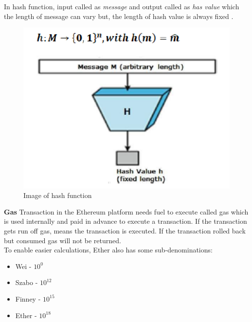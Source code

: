In hash function, input called as \textit{message} and output called as  \textit{has value} which the length of message can vary but, the length of hash value is always fixed \cite{fips}.\\
\begin{center}
	\begin{figure}[htb!]
		
		\begin{minipage}{0.35\linewidth}
			\centering
			\includegraphics[width=1.95\textwidth]{images/chap01_hash_function.png}
		\end{minipage}
		\caption[Image of hash function]{Image of hash function}
		
	\end{figure}
	
\end{center}
\textbf{Gas} Transaction in the Ethereum platform needs fuel to execute called gas which is used internally and paid in advance to execute a transaction. If the transaction gets run off gas, means the transaction is executed. If the transaction rolled back but consumed gas will not be returned.\\
To enable easier calculations, Ether also has some sub-denominations\cite{Egbertsen}:\\
\begin{itemize}
	\item Wei - $10^0$
	\item Szabo - $10^12$
	\item Finney - $10^15$
	\item Ether - $10^18$
\end{itemize}
